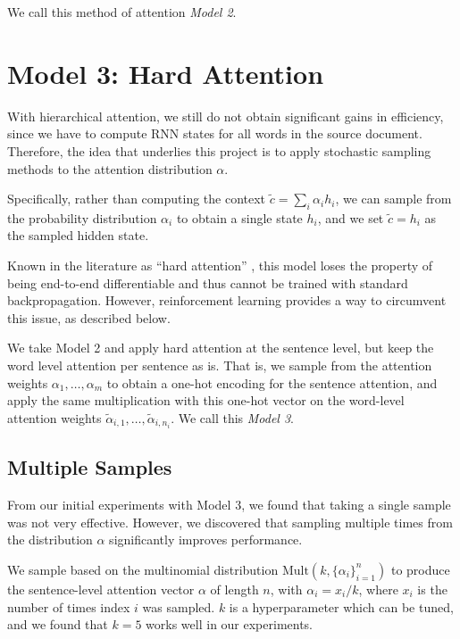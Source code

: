 \documentclass[11pt]{article}
\begin{document}
We call this method of attention \emph{Model 2}.

\section{Model 3: Hard Attention}

With hierarchical attention, we still do not obtain significant gains in efficiency, since we have to compute RNN states for all words in the source document. Therefore, the idea that underlies this project is to apply stochastic sampling methods to the attention distribution $\alpha$.

Specifically, rather than computing the context $\widetilde{c} = \sum_i \alpha_i h_i$, we can sample from the probability distribution $\alpha_i$ to obtain a single state $h_i$, and we set $\widetilde{c} = h_i$ as the sampled hidden state.

Known in the literature as ``hard attention'' \citep{xu2015captioning}, this model loses the property of being end-to-end differentiable and thus cannot be trained with standard backpropagation. However, reinforcement learning provides a way to circumvent this issue, as described below.

We take Model 2 and apply hard attention at the sentence level, but keep the word level attention per sentence as is. That is, we sample from the attention weights $\alpha_1, \ldots, \alpha_m$ to obtain a one-hot encoding for the sentence attention, and apply the same multiplication with this one-hot vector on the word-level attention weights $\widetilde{\alpha}_{i,1}, \ldots, \widetilde{\alpha}_{i,n_i}$. We call this \emph{Model 3}.


\subsection{Multiple Samples}

From our initial experiments with Model 3, we found that taking a single sample was not very effective. However, we discovered that sampling multiple times from the distribution $\alpha$ significantly improves performance.

We sample based on the multinomial distribution $\mathrm{Mult}(k, \{\alpha_i\}_{i=1}^n)$ to produce the sentence-level attention vector $\alpha$ of length $n$, with $\alpha_i = x_i / k$, where $x_i$ is the number of times index $i$ was sampled. $k$ is a hyperparameter which can be tuned, and we found that $k=5$ works well in our experiments.
\end{document}
